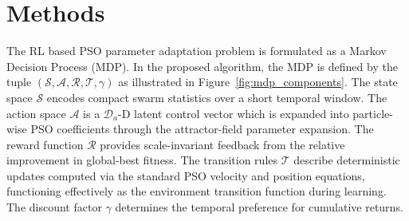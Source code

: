 \documentclass[final,5p,times]{elsarticle}
\newcommand{\symActiondim}{\mathcal{D}_a}
\newcommand{\symGamma}{\gamma}
\begin{document}
\section{Methods}
\label{sec:methods}
The RL based PSO parameter adaptation problem is formulated as a Markov Decision Process (MDP).
In the proposed algorithm, the MDP is defined by the tuple $(\mathcal{S}, \mathcal{A}, \mathcal{R}, \mathcal{T}, \symGamma)$ as illustrated in Figure~\ref{fig:mdp_components}.
The state space $\mathcal{S}$ encodes compact swarm statistics over a short temporal window.
The action space $\mathcal{A}$ is a $\symActiondim$-D latent control vector which is expanded into particle-wise PSO coefficients through the attractor-field parameter expansion.
The reward function $\mathcal{R}$ provides scale-invariant feedback from the relative improvement in global-best fitness.
The transition rules $\mathcal{T}$ describe deterministic updates computed via the standard PSO velocity and position equations, functioning effectively as the environment transition function during learning.
The discount factor $\symGamma$ determines the temporal preference for cumulative returns.
\end{document}
